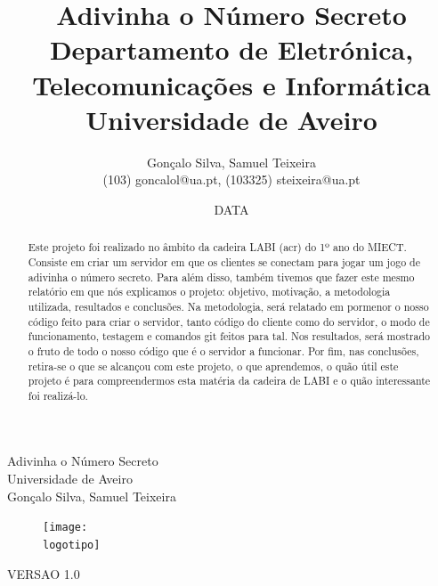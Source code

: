 \documentclass{report}
\begin{document}
%
\def\titulo{Adivinha o Número Secreto}
\def\data{DATA}
\def\autores{Gonçalo Silva, Samuel Teixeira}
\def\autorescontactos{(103) goncalol@ua.pt, (103325) steixeira@ua.pt}
\def\versao{VERSAO 1.0}
\def\departamento{Departamento de Eletrónica, Telecomunicações e Informática}
\def\empresa{Universidade de Aveiro}
\def\logotipo{ua.pdf}
%
%
\renewcommand{\contentsname}{Índice}
\begin{titlepage}

\begin{center}
%
\vspace*{50mm}
%
{\Huge \titulo}\\ 
%
\vspace{10mm}
%
{\Large \empresa}\\
%
\vspace{10mm}
%
{\LARGE \autores}\\ 
%
\vspace{30mm}
%
\begin{figure}[h]
\center
\texttt{[image: \\logotipo]}
\end{figure}
%
\vspace{30mm}
\end{center}
%
\begin{flushright}
\versao
\end{flushright}
\end{titlepage}

\title{%
{\Huge\textbf{\titulo}}\\
{\Large \departamento\\ \empresa}
}
%
\author{%
    \autores \\
    \autorescontactos
}
%
\date{\data}
%
\maketitle


\begin{abstract}
Este projeto foi realizado no âmbito da cadeira LABI (acr) do 1º ano do MIECT.
Consiste em criar um servidor em que os clientes se conectam para jogar um jogo de
adivinha o número secreto. Para além disso, também tivemos que fazer este mesmo 
relatório em que nós explicamos o projeto: objetivo, motivação, a metodologia utilizada, resultados e
conclusões. Na metodologia, será relatado em pormenor o nosso código feito para criar o servidor, tanto
código do cliente como do servidor, o modo de funcionamento, testagem e comandos git feitos para tal.
Nos resultados, será mostrado o fruto de todo o nosso código que é o servidor a funcionar.
Por fim, nas conclusões, retira-se o que se alcançou com este projeto, o que aprendemos,
o quão útil este projeto é para compreendermos esta matéria da cadeira de LABI e o 
quão interessante foi realizá-lo.
\end{abstract}
\end{document}
